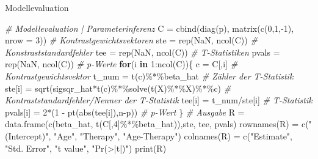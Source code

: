 \documentclass[
  8pt,
  ignorenonframetext,
]{beamer}
\newenvironment{Shaded}{\begin{snugshade}}{\end{snugshade}}
\newcommand{\AttributeTok}[1]{\textcolor[rgb]{0.77,0.63,0.00}{#1}}
\newcommand{\CommentTok}[1]{\textcolor[rgb]{0.56,0.35,0.01}{\textit{#1}}}
\newcommand{\ConstantTok}[1]{\textcolor[rgb]{0.00,0.00,0.00}{#1}}
\newcommand{\ControlFlowTok}[1]{\textcolor[rgb]{0.13,0.29,0.53}{\textbf{#1}}}
\newcommand{\DecValTok}[1]{\textcolor[rgb]{0.00,0.00,0.81}{#1}}
\newcommand{\FunctionTok}[1]{\textcolor[rgb]{0.00,0.00,0.00}{#1}}
\newcommand{\NormalTok}[1]{#1}
\newcommand{\OtherTok}[1]{\textcolor[rgb]{0.56,0.35,0.01}{#1}}
\newcommand{\SpecialCharTok}[1]{\textcolor[rgb]{0.00,0.00,0.00}{#1}}
\newcommand{\StringTok}[1]{\textcolor[rgb]{0.31,0.60,0.02}{#1}}
\begin{document}
\begin{frame}[fragile]{Modellevaluation}
\begin{Shaded}
\begin{Highlighting}[]
\CommentTok{\# Modellevaluation | Parameterinferenz}
\NormalTok{C          }\OtherTok{=} \FunctionTok{cbind}\NormalTok{(}\FunctionTok{diag}\NormalTok{(p), }\FunctionTok{matrix}\NormalTok{(}\FunctionTok{c}\NormalTok{(}\DecValTok{0}\NormalTok{,}\DecValTok{1}\NormalTok{,}\SpecialCharTok{{-}}\DecValTok{1}\NormalTok{), }\AttributeTok{nrow =} \DecValTok{3}\NormalTok{))      }\CommentTok{\# Kontrastgewichtsvektoren}
\NormalTok{ste        }\OtherTok{=} \FunctionTok{rep}\NormalTok{(}\ConstantTok{NaN}\NormalTok{, }\FunctionTok{ncol}\NormalTok{(C))                                }\CommentTok{\# Konstraststandardfehler}
\NormalTok{tee        }\OtherTok{=} \FunctionTok{rep}\NormalTok{(}\ConstantTok{NaN}\NormalTok{, }\FunctionTok{ncol}\NormalTok{(C))                                }\CommentTok{\# T{-}Statistiken}
\NormalTok{pvals      }\OtherTok{=} \FunctionTok{rep}\NormalTok{(}\ConstantTok{NaN}\NormalTok{, }\FunctionTok{ncol}\NormalTok{(C))                                }\CommentTok{\# p{-}Werte}
\ControlFlowTok{for}\NormalTok{(i }\ControlFlowTok{in} \DecValTok{1}\SpecialCharTok{:}\FunctionTok{ncol}\NormalTok{(C))\{}
\NormalTok{    c        }\OtherTok{=}\NormalTok{ C[,i]                                          }\CommentTok{\# Kontrastgewichtsvektor}
\NormalTok{    t\_num    }\OtherTok{=} \FunctionTok{t}\NormalTok{(c)}\SpecialCharTok{\%*\%}\NormalTok{beta\_hat                                }\CommentTok{\# Zähler der T{-}Statistik}
\NormalTok{    ste[i]   }\OtherTok{=} \FunctionTok{sqrt}\NormalTok{(sigsqr\_hat}\SpecialCharTok{*}\FunctionTok{t}\NormalTok{(c)}\SpecialCharTok{\%*\%}\FunctionTok{solve}\NormalTok{(}\FunctionTok{t}\NormalTok{(X)}\SpecialCharTok{\%*\%}\NormalTok{X)}\SpecialCharTok{\%*\%}\NormalTok{c)    }\CommentTok{\# Kontraststandardfehler/Nenner der T{-}Statistik}
\NormalTok{    tee[i]   }\OtherTok{=}\NormalTok{ t\_num}\SpecialCharTok{/}\NormalTok{ste[i]                                   }\CommentTok{\# T{-}Statistik}
\NormalTok{    pvals[i] }\OtherTok{=} \DecValTok{2}\SpecialCharTok{*}\NormalTok{(}\DecValTok{1} \SpecialCharTok{{-}} \FunctionTok{pt}\NormalTok{(}\FunctionTok{abs}\NormalTok{(tee[i]),n}\SpecialCharTok{{-}}\NormalTok{p))                    }\CommentTok{\# p{-}Wert}
\NormalTok{\}}
\CommentTok{\# Ausgabe}
\NormalTok{R            }\OtherTok{=} \FunctionTok{data.frame}\NormalTok{(}\FunctionTok{c}\NormalTok{(beta\_hat, }\FunctionTok{t}\NormalTok{(C[,}\DecValTok{4}\NormalTok{]}\SpecialCharTok{\%*\%}\NormalTok{beta\_hat)),ste, tee, pvals)}
\FunctionTok{rownames}\NormalTok{(R)  }\OtherTok{=} \FunctionTok{c}\NormalTok{(}\StringTok{"(Intercept)"}\NormalTok{, }\StringTok{"Age"}\NormalTok{, }\StringTok{"Therapy"}\NormalTok{, }\StringTok{"Age{-}Therapy"}\NormalTok{)}
\FunctionTok{colnames}\NormalTok{(R)  }\OtherTok{=} \FunctionTok{c}\NormalTok{(}\StringTok{"Estimate"}\NormalTok{, }\StringTok{"Std. Error"}\NormalTok{, }\StringTok{"t value"}\NormalTok{, }\StringTok{"Pr(\textgreater{}|t|)"}\NormalTok{)}
\FunctionTok{print}\NormalTok{(R)}
\end{Highlighting}
\end{Shaded}


\end{frame}
\end{document}
